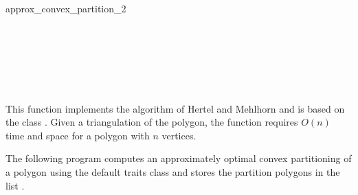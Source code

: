 \begin{ccRefFunction}{approx_convex_partition_2}
\ccSeeAlso

 \\
 \\
 \\
 \\
 \\

\ccImplementation
This function implements the algorithm of Hertel and Mehlhorn
\cite{hm-ftsp-83} and is based on the class 
.  Given a triangulation of
the polygon, the function requires $O(n)$ time and
space for a polygon with $n$ vertices.

\ccExample

The following program computes an approximately optimal
convex partitioning of a polygon using the default
traits class and stores the partition polygons in the list 
.


\end{ccRefFunction}

